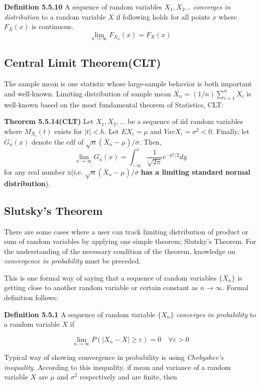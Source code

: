 \documentclass[10pt]{article}
\begin{document}
\noindent\textbf{Definition 5.5.10} A sequence of random variables $X_1,X_2...$ \textit{converges in distribution} to a random variable $X$ if following holds for all points $x$ where $F_X(x)$ is continuous.
$$
\lim_{n\rightarrow \infty}F_{X_n}(x)=F_X(x)
$$

\subsection{Central Limit Theorem(CLT)}
The sample mean is one statistic whose large-sample behavior is both important and well-known. Limiting distribution of sample mean $\overline{X}_n=(1/n)\sum_{i=1}^{n}X_i$ is well-known based on the most fundamental theorem of Statistics, CLT:\bigskip

\noindent\textbf{Theorem 5.5.14(CLT)} Let $X_1, X_2, ...$ be a sequence of iid random variables where $M_{X_i}(t)$ exists for $|t|<h$. Let $EX_i=\mu$ and $Var X_i = \sigma^2<0$. Finally, let $G_n(x)$ denote the cdf of $\sqrt{n}(\overline{X}_n-\mu)/\sigma$. Then,
$$
\displaystyle \lim_{n\rightarrow \infty}G_n(x)=\int_{-\infty}^{x}\frac{1}{\sqrt{2\pi}}e^{-y^2/2}dy
$$
for any real number x(i.e. $\sqrt{n}(\overline{X}_n-\mu)/\sigma$ \textbf{ has a limiting standard normal distribution}).

\subsection{Slutsky's Theorem}
There are some cases where a user can track limiting distribution of product or sum of random variables by applying one simple theorem; Slutsky's Theorem. For the understanding of the necessary condition of the theorem, knowledge on \textit{convergence in probability} must be preceded.\bigskip

\noindent This is one formal way of saying that a sequence of random variables $\{X_n\}$ is getting close to another random variable or certain constant as $n\rightarrow\infty$. Formal definition follows:\bigskip

\noindent \textbf{Definition 5.5.1} A sequence of random variable $\{X_n\}$ \textit{converges in probability} to a random variable $X$ if

$$
\displaystyle\lim_{n\rightarrow\infty}P(|X_n-X|\geq\varepsilon)=0\quad \forall\varepsilon>0
$$

\noindent Typical way of showing convergence in probability is using \textit{Chebyshev's inequality}. According to this inequality, if mean and variance of a random variable $X$ are $\mu$ and $\sigma^2$ respectively and are finite, then 
\end{document}
